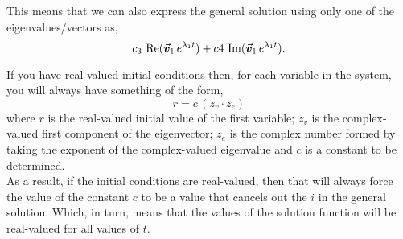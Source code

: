 \documentclass[../MathsNotesBase.tex]{subfiles}
\begin{document}
{		This means that we can also express the general solution using only one of the eigenvalues/vectors as,
		\[ c_3 \, \operatorname{Re}(\vec{\bm{v}}_1 \, e^{\lambda_1 t}) + c4 \, \operatorname{Im}(\vec{\bm{v}}_1 \, e^{\lambda_1 t}). \]
		
		\biggerskip
		If you have real-valued initial conditions then, for each variable in the system, you will always have something of the form,
		\[ r = c \, (z_{v} \cdot z_{e}) \]
		where $r$ is the real-valued initial value of the first variable; $z_{v}$ is the complex-valued first component of the eigenvector; $z_{e}$ is the complex number formed by taking the exponent of the complex-valued eigenvalue and $c$ is a constant to be determined.\\
		
		As a result, if the initial conditions are real-valued, then that will always force the value of the constant $c$ to be a value that cancels out the $i$ in the general solution. Which, in turn, means that the values of the solution function will be real-valued for all values of $t$.


}
\end{document}
